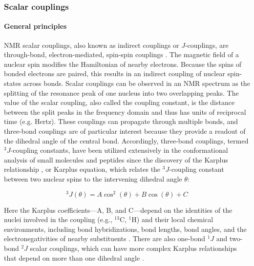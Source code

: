 \documentclass[9pt,review]{livecoms}
\begin{document}
\subsubsection{Scalar couplings}
\label{sub2:j_coupling}

\paragraph{General principles}

NMR scalar couplings, also known as indirect couplings or $J$-couplings, are through-bond, electron-mediated, spin-spin couplings \cite{karplus_contact_1959,karplus_vicinal_1963}.
The magnetic field of a nuclear spin modifies the Hamiltonian of nearby electrons.
Because the spins of bonded electrons are paired, this results in an indirect coupling of nuclear spin-states across bonds.
Scalar couplings can be observed in an NMR spectrum as the splitting of the resonance peak of one nucleus into two overlapping peaks.
The value of the scalar coupling, also called the coupling constant, is the distance between the split peaks in the frequency domain and thus has units of reciprocal time (e.g. Hertz).
These couplings can propagate through multiple bonds, and three-bond couplings are of particular interest because they provide a readout of the dihedral angle of the central bond. Accordingly, three-bond couplings, termed $^3J$-coupling constants, have been utilized extensively in the conformational analysis of small molecules \cite{karplus_vicinal_1963} and peptides \cite{bystrov_spinspin_1976} since the discovery of the Karplus relationship \cite{karplus_contact_1959}, or Karplus equation, which relates the $^3J$-coupling constant between two nuclear spins to the intervening dihedral angle $\theta$:

\begin{equation}
\label{eqn:karplus}
^3J(\theta) = A \cos^2 (\theta) + B \cos (\theta) + C
\end{equation}

\noindent Here the Karplus coefficients---A, B, and C---depend on the identities of the nuclei involved in the coupling  (e.g., $^{13}$C, $^1$H) and their local chemical environments, including bond hybridizations, bond lengths, bond angles, and the electronegativities of nearby substituents \cite{haasnoot_relationship_1980}.
There are also one-bond $^1J$ and two-bond $^2J$ scalar couplings, which can have more complex Karplus relationships that depend on more than one dihedral angle \cite{vuister_use_1993,cornilescu_large_2000,wirmer_angular_2002,ding_protein_2004,gapsys_improved_2015}.
\end{document}
